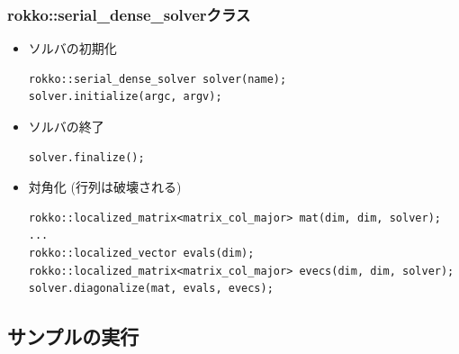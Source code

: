 \begin{frame}[c,fragile]
  \frametitle{rokko::serial\_dense\_solverクラス}
  \begin{itemize}
  \item ソルバの初期化
\begin{lstlisting}
rokko::serial_dense_solver solver(name);
solver.initialize(argc, argv);
\end{lstlisting}
  \item ソルバの終了
\begin{lstlisting}
solver.finalize();
\end{lstlisting}
  \item 対角化 (行列は破壊される)
\begin{lstlisting}
rokko::localized_matrix<matrix_col_major> mat(dim, dim, solver);
...
rokko::localized_vector evals(dim);
rokko::localized_matrix<matrix_col_major> evecs(dim, dim, solver);
solver.diagonalize(mat, evals, evecs);
\end{lstlisting}
  \end{itemize}
\end{frame}

\subsection{サンプルの実行}

